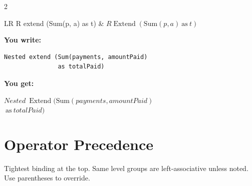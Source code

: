 \documentclass[10pt,landscape,a4paper]{article}
\newenvironment{exwrite}%
  {\par\nobreak\noindent\scriptsize\textbf{You write:}\par\nobreak\vspace{0pt}\scriptsize}%
  {\vspace{1pt}\nobreak}
\newenvironment{exget}%
  {\par\nobreak\noindent\scriptsize\textbf{You get:}\par\nobreak\vspace{0pt}\small}%
  {\par\vspace{3pt}}
\begin{document}
\begin{multicols}{2}
\begin{tabularx}{\columnwidth}{LR}
R extend (Sum(p, a) as t) & $R \mathop{\mathrm{Extend}}(\mathrm{Sum}(p, a)~\mathrm{as}~t)$ \\
\end{tabularx}

\begin{exwrite}
\begin{verbatim}
Nested extend (Sum(payments, amountPaid)
               as totalPaid)
\end{verbatim}
\end{exwrite}
\begin{exget}
\begin{center}
$Nested~\mathop{\mathrm{Extend}}(\mathrm{Sum}(payments, amountPaid)$\\
$~\mathrm{as}~totalPaid)$
\end{center}
\end{exget}

\end{multicols}

\newpage

\section{Operator Precedence}

{\scriptsize Tightest binding at the top.  Same level groups are left-associative unless noted.  Use parentheses to override.}

\smallskip
\end{document}
